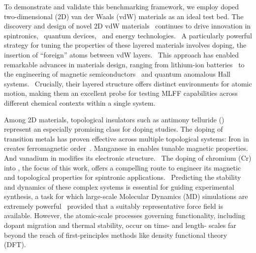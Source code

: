 \documentclass[pdflatex,sn-mathphys-num]{sn-jnl}%
\theoremstyle{thmstyleone}%
\theoremstyle{thmstyletwo}%
\theoremstyle{thmstylethree}%
\begin{document}
To demonstrate and validate this benchmarking framework, we employ doped two-dimensional (2D) van der Waals (vdW) materials as an ideal test bed. The discovery and design of novel 2D vdW materials~\citep{novoselov_2d_2016, manzeli_2d_2017, akinwande2017review, guo_stacking_2021, liu_roadmap_2024} continues to drive innovation in spintronics,~\citep{he_topological_2022} quantum devices,~\citep{qian_van_2024, song_electron_2018, nayak_microsoft_2025} and energy technologies.~\citep{jin_flexible_2019,gautam_creation_2024} A particularly powerful strategy for tuning the properties of these layered materials involves doping, the insertion of ``foreign'' atoms between vdW layers.~\citep{novoselov_2d_2016, whittingham_lithium_2004} This approach has enabled remarkable advances in materials design, ranging from lithium-ion batteries~\citep{winter_insertion_1998, hu_lithium_2024} to the engineering of magnetic semiconductors~\citep{gibertini_magnetic_2019} and quantum anomalous Hall systems.~\citep{tokura_magnetic_2019} Crucially, their layered structure offers distinct environments for atomic motion, making them an excellent probe for testing MLFF capabilities across different chemical contexts within a single system.

Among 2D materials, topological insulators such as antimony telluride ()~\citep{zhang_topological_2009, guo_roadmap_2015} represent an especially promising class for doping studies. The doping of transition metals has proven effective across multiple topological systems: Iron in  creates ferromagnetic order~\citep{checkelsky_trajectory_2014, kulbachinskii_thermoelectric_2012, haazen_ferromagnetism_2012}. Manganese in  enables tunable magnetic properties.~\citep{klimovskikh_tunable_2020, fu_electronic_2021} And vanadium in  modifies its electronic structure.~\citep{sun_sb2te3_2023, zhang_quantum_2021} The doping of chromium (Cr) into , the focus of this work, offers a compelling route to engineer its magnetic and topological properties for spintronic applications.~\citep{cortie_creating_2020,han_effect_2013,de_a_deus_magnetic_2021} Predicting the stability and dynamics of these complex systems is essential for guiding experimental synthesis, a task for which large-scale Molecular Dynamics (MD) simulations are extremely powerful~\citep{Zhang2023TuningStudy,thompson_lammps_2022} provided that a suitably representative force field is available. However, the atomic-scale processes governing functionality, including dopant migration and thermal stability, occur on time- and length- scales far beyond the reach of first-principles methods like density functional theory (DFT).~\citep{kohn_self-consistent_1965, perdew_generalized_1996, sohier_density_2017,choudhary_high-throughput_2017}
\end{document}
